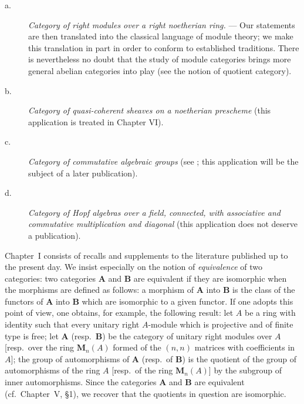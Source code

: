 \begin{description}
\item[\normalfont a.] \emph{Category of right modules over a right noetherian
ring.} --- Our statements are then translated into the classical language of
module theory; we make this translation in part in order to conform to
established traditions. There is nevertheless no doubt that the study of
module categories brings more general abelian categories into play (see the
notion of quotient category).

\item[\normalfont b.] \emph{Category of quasi-coherent sheaves on a noetherian
prescheme} (this application is treated in Chapter VI).

\item[\normalfont c.] \emph{Category of commutative algebraic groups} (see
\cite{serre-groupes}; this application will be the subject of a later publication).

\item[\normalfont d.] \emph{Category of Hopf algebras over a field,
connected, with associative and commutative multiplication and diagonal}
(this application does not deserve a publication).
\end{description}

Chapter~I consists of recalls and supplements to the literature published up
to the present day. We insist especially on the notion of \emph{equivalence}
of two categories: two categories $\mathbf{A}$ and $\mathbf{B}$ are
equivalent if they are isomorphic when the morphisms are defined as follows: a
morphism of $\mathbf{A}$ into $\mathbf{B}$ is the class of the functors of
$\mathbf{A}$ into $\mathbf{B}$ which are isomorphic to a given functor. If
one adopts this point of view, one obtains, for example, the following result:
let $A$ be a ring with identity such that every unitary right $A$-module which
is projective and of finite type is free; let $\mathbf{A}$ (resp.\
$\mathbf{B}$) be the category of unitary right modules over $A$ [resp.\ over
the ring $\mathbf{M}_n(A)$ formed of the $(n,n)$ matrices with coefficients in
$A$]; the group of automorphisms of $\mathbf{A}$ (resp.\ of $\mathbf{B}$) is
the quotient of the group of automorphisms of the ring $A$ [resp.\ of the
ring $\mathbf{M}_n(A)$] by the subgroup of inner automorphisms. Since the
categories $\mathbf{A}$ and $\mathbf{B}$ are equivalent (cf.\ Chapter~V,
\S1), we recover that the quotients in question are isomorphic.

